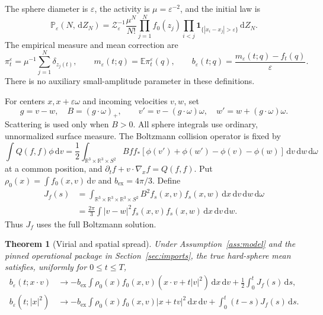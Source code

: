 \documentclass[11pt,letterpaper]{article}
\numberwithin{equation}{section}
\newtheorem{theorem}{Theorem}[section]
\theoremstyle{definition}\newtheorem{assumption}[theorem]{Assumption}
\theoremstyle{remark}\newtheorem{remark}[theorem]{Remark}
\newcommand{\R}{\mathbb R}\newcommand{\E}{\mathbb E}\newcommand{\Prob}{\mathbb P}
\newcommand{\eps}{\varepsilon}\newcommand{\dd}{\,\mathrm d}
\newcommand{\ind}{\mathbf 1}\newcommand{\TV}{\mathrm{TV}}
\newcommand{\bex}{b_{\mathrm{ex}}}\newcommand{\Pcoll}{\Pi_{\mathrm{coll}}}
\begin{document}
The sphere diameter is $\eps$, the activity is $\mu=\eps^{-2}$, and the initial law is
\begin{equation}\label{eq:ensemble}
 \Prob_\eps(N,\dd Z_N)=\mathcal Z_\eps^{-1}\frac{\mu^N}{N!}
 \prod_{j=1}^N f_0(z_j)
 \prod_{i<j}\ind_{\{|x_i-x_j|>\eps\}}\dd Z_N.
\end{equation}
The empirical measure and mean correction are
\[
 \pi_t^\eps=\mu^{-1}\sum_{j=1}^N\delta_{z_j(t)},\qquad
 m_\eps(t;q)=\E\pi_t^\eps(q),\qquad
 b_\eps(t;q)=\frac{m_\eps(t;q)-f_t(q)}{\eps}.
\]
There is no auxiliary small-amplitude parameter in these definitions.

For centers $x,x+\eps\omega$ and incoming velocities $v,w$, set
\begin{equation}\label{eq:collision}
 g=v-w,\quad B=(g\cdot\omega)_+,\qquad
 v'=v-(g\cdot\omega)\omega,\quad w'=w+(g\cdot\omega)\omega.
\end{equation}
Scattering is used only when $B>0$. All sphere integrals use ordinary, unnormalized surface measure. The Boltzmann collision operator is fixed by
\[
 \int Q(f,f)\phi\dd v
 =\frac12\int_{\R^3\times\R^3\times S^2}
 Bff_*[\phi(v')+\phi(w')-\phi(v)-\phi(w)]\dd v\dd w\dd\omega
\]
at a common position, and $\partial_t f+v\cdot\nabla_xf=Q(f,f)$.
Put $\rho_0(x)=\int f_0(x,v)\dd v$ and $\bex=4\pi/3$. Define
\begin{equation}\label{eq:J}
 \begin{split}
 J_f(s)&=\int_{\R^3\times\R^3\times\R^3\times S^2}
 B^2 f_s(x,v)f_s(x,w)\dd x\dd v\dd w\dd\omega\\
 &=\frac{2\pi}{3}\int |v-w|^2 f_s(x,v)f_s(x,w)\dd x\dd v\dd w.
 \end{split}
\end{equation}
Thus $J_f$ uses the full Boltzmann solution.

\begin{theorem}[Virial and spatial spread]\label{thm:virial}
Under Assumption~\ref{ass:model} and the pinned operational package in Section~\ref{sec:imports}, the true hard-sphere mean satisfies, uniformly for $0\le t\le T$,
\begin{align}
 b_\eps(t;x\cdot v)&\longrightarrow
 -\bex\int\rho_0(x)f_0(x,v)(x\cdot v+t|v|^2)\dd x\dd v
 +\frac12\int_0^t J_f(s)\dd s,\label{eq:virial-limit}\\
 b_\eps(t;|x|^2)&\longrightarrow
 -\bex\int\rho_0(x)f_0(x,v)|x+tv|^2\dd x\dd v
 +\int_0^t(t-s)J_f(s)\dd s.\label{eq:spread-limit}
\end{align}
\end{theorem}
\end{document}
